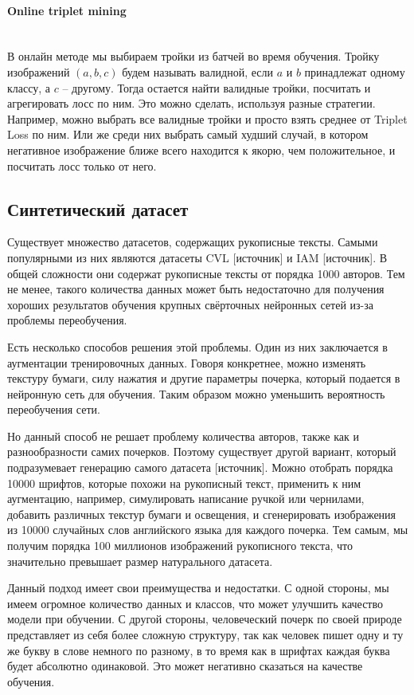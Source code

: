 \paragraph{Online triplet mining}\mbox{} \\

В онлайн методе мы выбираем тройки из батчей во время обучения. Тройку изображений $(a, b, c)$ будем называть валидной, если $a$ и $b$ принадлежат одному классу, а $c$ -- другому. Тогда остается найти валидные тройки, посчитать и агрегировать лосс по ним. Это можно сделать, используя разные стратегии. Например, можно выбрать все валидные тройки и просто взять среднее от Triplet Loss по ним. Или же среди них выбрать самый худший случай, в котором негативное изображение ближе всего находится к якорю, чем положительное, и посчитать лосс только от него.

\subsection{Синтетический датасет}

Существует множество датасетов, содержащих рукописные тексты. Самыми популярными из них являются датасеты CVL [источник] и IAM [источник]. В общей сложности они содержат рукописные тексты от порядка 1000 авторов. Тем не менее, такого количества данных может быть недостаточно для получения хороших результатов обучения крупных свёрточных нейронных сетей из-за проблемы переобучения. 

Есть несколько способов решения этой проблемы. Один из них заключается в аугментации тренировочных данных. Говоря конкретнее, можно изменять текстуру бумаги, силу нажатия и другие параметры почерка, который подается в нейронную сеть для обучения. Таким образом можно уменьшить вероятность переобучения сети.

Но данный способ не решает проблему количества авторов, также как и разнообразности самих почерков. Поэтому существует другой вариант, который подразумевает генерацию самого датасета [источник]. Можно отобрать порядка 10000 шрифтов, которые похожи на рукописный текст, применить к ним аугментацию, например, симулировать написание ручкой или чернилами, добавить различных текстур бумаги и освещения, и сгенерировать изображения из 10000 случайных слов английского языка для каждого почерка. Тем самым, мы получим порядка 100 миллионов изображений рукописного текста, что значительно превышает размер натурального датасета.

Данный подход имеет свои преимущества и недостатки. С одной стороны, мы имеем огромное количество данных и классов, что может улучшить качество модели при обучении. С другой стороны, человеческий почерк по своей природе представляет из себя более сложную структуру, так как человек пишет одну и ту же букву в слове немного по разному, в то время как в шрифтах каждая буква будет абсолютно одинаковой. Это может негативно сказаться на качестве обучения.

